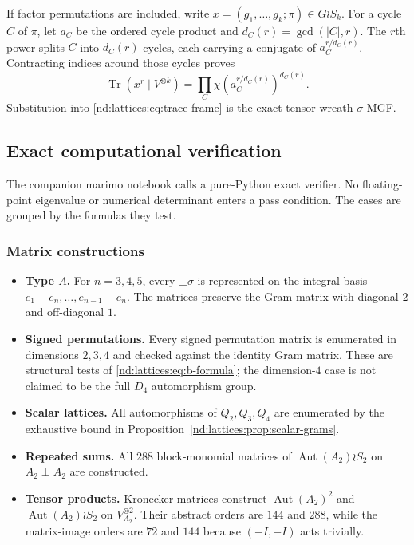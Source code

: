 \documentclass[10pt]{article}
\newcommand{\Tr}{\operatorname{Tr}}
\newcommand{\Aut}{\operatorname{Aut}}
\begin{document}
If factor permutations are included, write
$x=(g_1,\ldots,g_k;\pi)\in G\wr S_k$.  For a cycle $C$ of $\pi$, let $a_C$
be the ordered cycle product and $d_C(r)=\gcd(|C|,r)$.  The $r$th power splits
$C$ into $d_C(r)$ cycles, each carrying a conjugate of
$a_C^{r/d_C(r)}$.  Contracting indices around those cycles proves
\begin{equation}\label{nd:lattices:eq:tensor-wreath-trace}
 \boxed{\Tr(x^r\mid V^{\otimes k})
 =\prod_C\chi\!\left(a_C^{r/d_C(r)}\right)^{d_C(r)}.}
\end{equation}
Substitution into \eqref{nd:lattices:eq:trace-frame} is the exact tensor-wreath
$\sigma$-MGF.

\subsection{Exact computational verification}

The companion marimo notebook calls a pure-Python exact verifier.  No
floating-point eigenvalue or numerical determinant enters a pass condition.
The cases are grouped by the formulas they test.

\subsubsection*{Matrix constructions}
\begin{itemize}
\item \textbf{Type $A$.}  For $n=3,4,5$, every $\pm\sigma$ is represented on
the integral basis $e_1-e_n,\ldots,e_{n-1}-e_n$.  The matrices preserve the
Gram matrix with diagonal $2$ and off-diagonal $1$.
\item \textbf{Signed permutations.}  Every signed permutation matrix is
enumerated in dimensions $2,3,4$ and checked against the identity Gram
matrix.  These are structural tests of \eqref{nd:lattices:eq:b-formula}; the dimension-$4$
case is not claimed to be the full $D_4$ automorphism group.
\item \textbf{Scalar lattices.}  All automorphisms of $Q_2,Q_3,Q_4$ are
enumerated by the exhaustive bound in Proposition~\ref{nd:lattices:prop:scalar-grams}.
\item \textbf{Repeated sums.}  All $288$ block-monomial matrices of
$\Aut(A_2)\wr S_2$ on $A_2\perp A_2$ are constructed.
\item \textbf{Tensor products.}  Kronecker matrices construct
$\Aut(A_2)^2$ and $\Aut(A_2)\wr S_2$ on $V_{A_2}^{\otimes2}$.  Their abstract
orders are $144$ and $288$, while the matrix-image orders are $72$ and $144$
because $(-I,-I)$ acts trivially.
\end{itemize}
\end{document}
